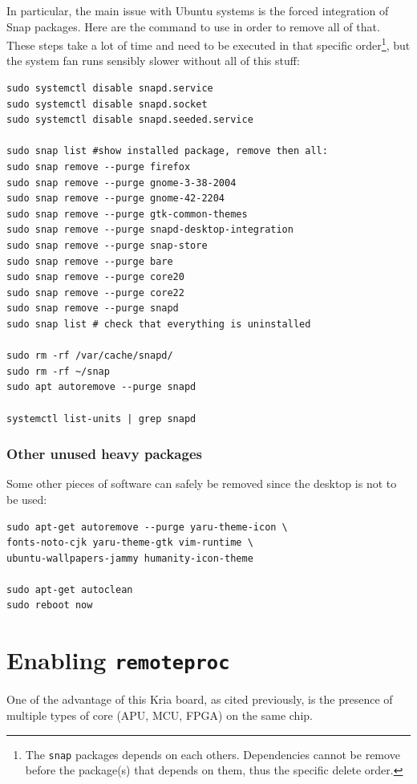 \documentclass[10pt]{article}
\begin{document}
In particular, the main issue with Ubuntu systems is the forced integration of
Snap packages. Here are the command to use in order to remove all of that.
These steps take a lot of time and need to be executed in that specific order\footnote{The \texttt{snap} packages depends on each others. Dependencies
cannot be remove before the package(s) that depends on them,
thus the specific delete order.},
but the system fan runs sensibly slower without all of this stuff:

\begin{verbatim}
sudo systemctl disable snapd.service
sudo systemctl disable snapd.socket
sudo systemctl disable snapd.seeded.service

sudo snap list #show installed package, remove then all:
sudo snap remove --purge firefox
sudo snap remove --purge gnome-3-38-2004
sudo snap remove --purge gnome-42-2204
sudo snap remove --purge gtk-common-themes
sudo snap remove --purge snapd-desktop-integration
sudo snap remove --purge snap-store
sudo snap remove --purge bare
sudo snap remove --purge core20
sudo snap remove --purge core22
sudo snap remove --purge snapd
sudo snap list # check that everything is uninstalled

sudo rm -rf /var/cache/snapd/
sudo rm -rf ~/snap
sudo apt autoremove --purge snapd

systemctl list-units | grep snapd
\end{verbatim}

\subsubsection{Other unused heavy packages}
\label{sec:orge27861c}
Some other pieces of software can safely be removed since the desktop is
not to be used:

\begin{verbatim}
sudo apt-get autoremove --purge yaru-theme-icon \
fonts-noto-cjk yaru-theme-gtk vim-runtime \
ubuntu-wallpapers-jammy humanity-icon-theme

sudo apt-get autoclean
sudo reboot now
\end{verbatim}

\section{Enabling \texttt{remoteproc}}
\label{sec:orgbe890d9}
One of the advantage of this Kria board, as cited previously, is the presence of
multiple types of core (APU, MCU, FPGA) on the same chip.
\end{document}
